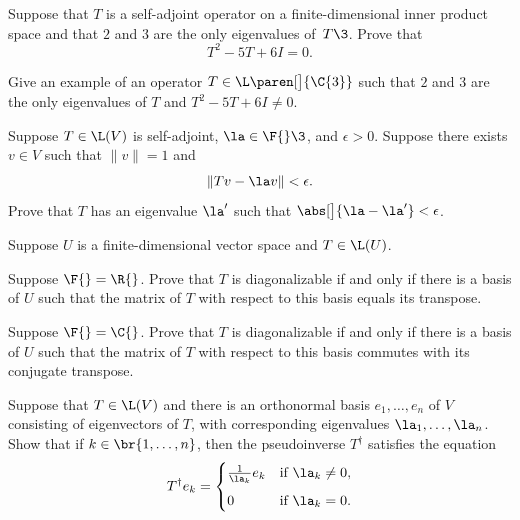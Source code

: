 \exercise
Suppose that $T$ is a self-adjoint operator on a finite-dimensional inner
product space and that $2$ and $3$ are the only eigenvalues of~$T\3$.  Prove that
\[
T^2 - 5T + 6I = 0.
\]
\exercisedisplayend


\exercise
Give an example of an operator $T \in \L\paren[\big]{\C{3}}$ such that $2$ and $3$ are the only
eigenvalues of $T$ and
$
T^2 - 5T + 6I \ne 0$.


\exercise
Suppose $T \in \L(V)$ is self-adjoint, $\la \in \F{}\3$, and $\epsilon > 0$.  Suppose
there exists $v \in V$ such that $\|v\| = 1$ and
\[
\|Tv - \la v\| < \epsilon.
\]
Prove that $T$ has an eigenvalue $\la'$ such that $\abs[\big]{\la - \la'} < \epsilon$.

\exercise
Suppose $U$ is a finite-dimensional vector space and $T \in \L(U)$.\label{Diag2}
\begin{subtheorem}
\item
Suppose $\F{} = \R{}$. Prove that $T$ is diagonalizable if and only if there is a basis of $U$ such that the matrix of $T$ with respect to this basis equals its transpose.
\item
Suppose $\F{} = \C{}$. Prove that $T$ is diagonalizable if and only if there is a basis of $U$ such that the matrix of $T$ with respect to this basis commutes with its conjugate transpose.
\end{subtheorem}


\exercise
Suppose that $T \in \L(V)$ and there is an orthonormal basis $e_1, \ldots, e_n$ of $V$ consisting of eigenvectors of $T$, with corresponding eigenvalues $\la_1, \ldots, \la_n$. Show that if
$k \in \br{1, \ldots, n}$, then the pseudoinverse $T^\dagger$ satisfies the equation
\[
T^\dagger e_k = \begin{cases}
\frac{1}{\la_k} e_k & \text{if } \la_k \ne 0, \\[6bp]
0 & \text{if } \la_k = 0.
\end{cases}
\]
\exercisedisplayend


